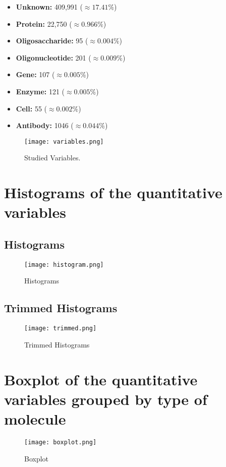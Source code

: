 \documentclass[10pt]{article}
\begin{document}
\begin{itemize}
\begin{itemize}
\begin{multicols}{2}
\begin{itemize}
                \item \textbf{Unknown:} 409,991 ($\approx 17.41\% $)
                \item \textbf{Protein:} 22,750 ($\approx 0.966\% $)
                \item \textbf{Oligosaccharide:} 95 ($\approx 0.004\% $)
                \item \textbf{Oligonucleotide:} 201 ($\approx 0.009\% $)
                \item \textbf{Gene:} 107 ($\approx 0.005\% $)
                \item \textbf{Enzyme:} 121 ($\approx 0.005\% $)
                \item \textbf{Cell:} 55 ($\approx 0.002\% $)
                \item \textbf{Antibody:} 1046 ($\approx 0.044\% $)
            \end{itemize}
        \end{multicols}
    \end{itemize}
\end{itemize}
\newpage


\begin{figure}[h]
  \centering
  \texttt{[image: variables.png]}
  \caption{Studied Variables.}
\end{figure}

\section{Histograms of the quantitative variables}
\subsection{Histograms}
\begin{figure}[h]
  \centering
  \texttt{[image: histogram.png]}
  \caption{Histograms}
\end{figure}
\newpage
\subsection{Trimmed Histograms}
\begin{figure}[h]
  \centering
  \texttt{[image: trimmed.png]}
  \caption{Trimmed Histograms}
\end{figure}

\section{Boxplot of the quantitative variables grouped by type of molecule}
\begin{figure}[h]
  \centering
  \texttt{[image: boxplot.png]}
  \caption{Boxplot}
\end{figure}
\end{document}
